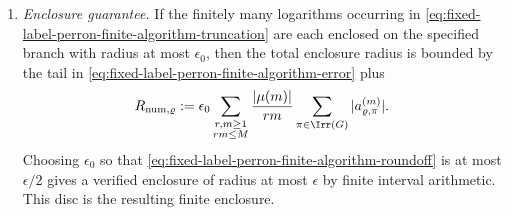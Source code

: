 \begin{lemma}
\begin{enumerate}[label=\textup{(\alph*)},leftmargin=*]
\begin{equation}
        \abs{F_\varrho(\lambda^{-1})-F_\varrho^{(M)}}
        \le
        C_\varrho
        \sum_{k>M}\frac{\mathrm d(k)}{k}\lambda^{1-k},
      \end{equation}
      for a constant \(C_\varrho\) depending only on the finite determinant
      collection and \(\varrho\).  The rational tail bound gives
      \begin{equation}\label{eq:fixed-label-rational-tail-envelope}
        C_\varrho
        \sum_{k>M}\frac{\mathrm d(k)}{k}\lambda^{1-k}
        \le
        Q_\varrho\frac{\theta^{M+1}}{1-\theta},
      \end{equation}
      because \(\mathrm d(k)\le k\).  Thus the truncations converge absolutely
      and exponentially, and the same finite procedure gives verified
      interval enclosures by truncating after the displayed rational tail
      bound.
    \item \emph{Enclosure guarantee.}  If
      the finitely many logarithms occurring in
      \eqref{eq:fixed-label-perron-finite-algorithm-truncation} are each
      enclosed on the specified branch with radius at most \(\epsilon_0\), then
      the total enclosure radius is bounded by the tail in
      \eqref{eq:fixed-label-perron-finite-algorithm-error} plus
      \begin{equation}\label{eq:fixed-label-perron-finite-algorithm-roundoff}
        R_{\mathrm{num},\varrho}:=\epsilon_0
        \sum_{\substack{r,m\ge1\\rm\le M}}
          \frac{|\mu(m)|}{rm}
          \sum_{\pi\in\Irr(G)}|a_{\varrho,\pi}^{(m)}| .
      \end{equation}
      Choosing \(\epsilon_0\) so that
      \eqref{eq:fixed-label-perron-finite-algorithm-roundoff} is at most
      \(\epsilon/2\) gives a verified enclosure of radius at most
      \(\epsilon\) by finite interval arithmetic.  This disc is the resulting finite enclosure.
  \end{enumerate}
\end{lemma}
